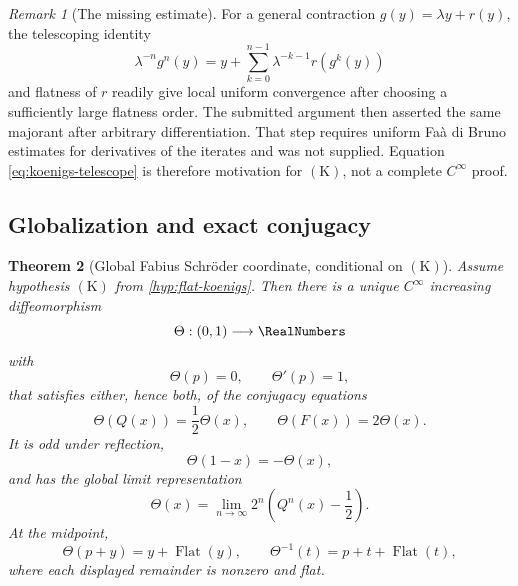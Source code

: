 \documentclass[11pt,oneside]{article}
\newtheorem{theorem}{Theorem}[section]
\theoremstyle{definition}
\theoremstyle{remark}
\newtheorem{remark}[theorem]{Remark}
\newcommand{\flatremainder}{\operatorname{Flat}}
\begin{document}
\begin{remark}[The missing estimate]
For a general contraction \(g(y)=\lambda y+r(y)\), the telescoping identity
\begin{equation}
 \lambda^{-n}g^n(y)
 =y+\sum_{k=0}^{n-1}\lambda^{-k-1}r(g^k(y))
 \label{eq:koenigs-telescope}
\end{equation}
and flatness of \(r\) readily give local uniform convergence after choosing a sufficiently
large flatness order.  The submitted argument then asserted the same majorant after arbitrary
differentiation.  That step requires uniform Faà di Bruno estimates for derivatives of the
iterates and was not supplied.  Equation \eqref{eq:koenigs-telescope} is therefore motivation
for \(\mathrm{(K)}\), not a complete \(C^\infty\) proof.
\end{remark}

\subsection{Globalization and exact conjugacy}

\begin{theorem}[Global Fabius Schr\"oder coordinate, conditional on \(\mathrm{(K)}\)]
\label{thm:global-theta}
Assume hypothesis \(\mathrm{(K)}\) from \cref{hyp:flat-koenigs}.  Then there is a unique
\(C^\infty\) increasing diffeomorphism
\begin{equation}
 \Theta:(0,1)\longrightarrow\RealNumbers
 \label{eq:theta-domain}
\end{equation}
with
\begin{equation}
 \Theta(p)=0,\qquad \Theta'(p)=1,
 \label{eq:theta-normalization}
\end{equation}
that satisfies either, hence both, of the conjugacy equations
\begin{equation}
 \boxed{\displaystyle
 \Theta(Q(x))=\frac12\Theta(x),
 \qquad
 \Theta(F(x))=2\Theta(x).}
 \label{eq:theta-conjugacy}
\end{equation}
It is odd under reflection,
\begin{equation}
 \Theta(1-x)=-\Theta(x),
 \label{eq:theta-odd}
\end{equation}
and has the global limit representation
\begin{equation}
 \boxed{\displaystyle
 \Theta(x)=\lim_{n\to\infty}2^n\left(Q^n(x)-\frac12\right).}
 \label{eq:theta-global-limit}
\end{equation}
At the midpoint,
\begin{equation}
 \Theta(p+y)=y+\flatremainder(y),
 \qquad
 \Theta^{-1}(t)=p+t+\flatremainder(t),
 \label{eq:theta-flat}
\end{equation}
where each displayed remainder is nonzero and flat.
\end{theorem}
\end{document}
